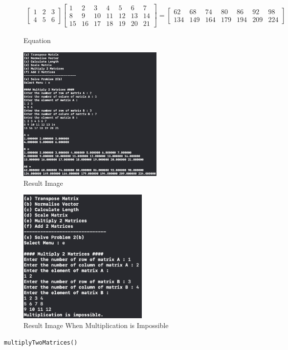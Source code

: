 \begin{figure}[h]
    \centering
    \begin{subfigure}[b]{\textwidth}
        \centering
        \begin {align*}
        \begin{bmatrix}
            1&2&3\\4&5&6
        \end{bmatrix}\begin{bmatrix}
            1&2&3&4&5&6&7\\8&9&10&11&12&13&14\\15&16&17&18&19&20&21
        \end{bmatrix}
        = \begin{bmatrix}
            62&68&74&80&86&92&98\\
            134&149&164&179&194&209&224
        \end{bmatrix}
        \end {align*}
        \caption{Equation}
        \label{fig:equation}
    \end{subfigure}
    \hfill
    \begin{subfigure}[b]{0.45\textwidth}
        \centering
        \includegraphics[height=6.7cm]{img/prj0/e.png}
        \caption{Result Image}
        \label{fig:image}
    \end{subfigure}
    \hfill
    \begin{subfigure}[b]{0.45\textwidth}
        \centering
        \includegraphics[height=6.7cm]{img/prj0/e-null.png}
        \caption{Result Image When Multiplication is Impossible}
        \label{fig:image}
    \end{subfigure}
    \caption{\texttt{multiplyTwoMatrices()}}
\end{figure}
\pagebreak

